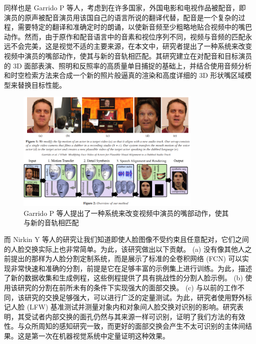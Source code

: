 同样也是 Garrido P 等人\cite{garrido2015vdub}，考虑到在许多国家，外国电影和电视作品被配音，即演员的原声被配音演员用该国自己的语言所说的翻译代替，配音是一个复杂的过程，需要特定的翻译和准确定时的朗诵，以使新音频至少粗略地贴合视频中的嘴巴动作。然而，由于原作和配音语言中的音素和视位序列不同，视频与音频的匹配永远不会完美，这是视觉不适的主要来源，在本文中，研究者提出了一种系统来改变视频中演员的嘴部动作，使其与新的音轨相匹配。其研究建立在对配音和目标演员的 3D 面部表演、照明和反照率的高质量单目捕捉的基础上，并结合使用音频分析和时空检索方法来合成一个新的照片般逼真的渲染和高度详细的 3D 形状嘴区域模型来替换目标性能。

\begin{figure}[htb]
\centering 
\includegraphics[width=0.80\textwidth]{img/ch1m5.png} 
\caption{Garrido P 等人提出了一种系统来改变视频中演员的嘴部动作，使其与新的音轨相匹配}
\label{Test}
\end{figure}

而 Nirkin Y 等人\cite{nirkin2018face}的研究让我们知道即使人脸图像不受约束且任意配对，它们之间的人脸交换实际上也非常简单。为此，该研究做出以下贡献。 (a) 没有像其他人之前提出的那样为人脸分割定制系统，而是展示了标准的全卷积网络 (FCN) 可以实现非常快速和准确的分割，前提是它在足够丰富的示例集上进行训练。为此，描述了新的数据收集和生成例程，这些例程提供了具有挑战性的分割人脸示例。 (b) 使用该研究的分割在前所未有的条件下实现强大的面部交换。 (c) 与以前的工作不同，该研究的交换足够强大，可以进行广泛的定量测试。为此，研究者使用野外标记人脸 (LFW) 基准测试并测量对象内和对象间人脸交换对识别的影响。研究表明，其受试者内部交换的面孔仍然与其来源一样可识别，证明了我们方法的有效性。与众所周知的感知研究一致，而更好的面部交换会产生不太可识别的主体间结果。这是第一次在机器视觉系统中定量证明这种效果。

